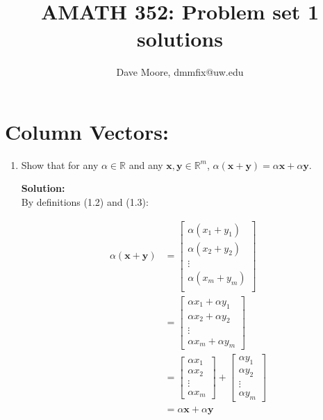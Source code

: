 \documentclass[]{article}
\title{AMATH 352: Problem set 1 solutions}
\author{Dave Moore, dmmfix@uw.edu}
\newcommand{\R}{\mathbb{R}}
\newcommand{\solution}{\vskip 0.5cm \textbf{\large Solution:} \\}
\begin{document}
\maketitle

\section*{Column Vectors:}

\begin{enumerate}
  
\item Show that for any $\alpha\in\R$ and any $\bm{x},\bm{y}\in\mathbb{R}^m$, $\alpha(\bm{x}+\bm{y}) = \alpha\bm{x} + \alpha\bm{y}$.
  
  \solution
  By definitions (1.2) and (1.3):

  \[
  \begin{split}
    \alpha (\bm{x} + \bm{y}) & =
    \begin{bmatrix}
      \alpha (x_{1} + y_{1}) \\
      \alpha (x_{2} + y_{2}) \\
      \vdots \\
      \alpha (x_{m} + y_{m}) \\
    \end{bmatrix} \\
    &=
    \begin{bmatrix}
      \alpha x_{1}  + \alpha y_{1} \\
      \alpha x_{2}  + \alpha y_{2} \\
      \vdots \\
      \alpha x_{m} + \alpha y_{m}
    \end{bmatrix} \\
    &=
    \begin{bmatrix}
      \alpha x_{1} \\
      \alpha x_{2} \\
      \vdots \\
      \alpha x_{m}
    \end{bmatrix} +
    \begin{bmatrix}
      \alpha y_{1} \\
      \alpha y_{2} \\
      \vdots \\
      \alpha y_{m}
    \end{bmatrix} \\
    &=
    \alpha\bm{x} + \alpha\bm{y}
  \end{split}
  \]  
  

\end{enumerate}
\end{document}
